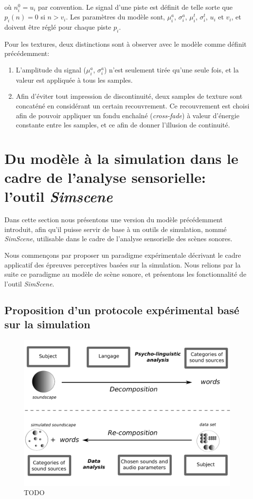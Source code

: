 où $n_i^0=u_i$ par convention. Le signal d'une piste est définit de telle sorte que $p_i(n)=0$ si $n>v_i$. Les paramètres du modèle sont, $\mu^a_i$,  $\sigma^a_i$,   $\mu^t_i$,  $\sigma^t_i$, $u_i$ et $v_i$, et doivent être réglé pour chaque piste $p_i$.


Pour les textures, deux distinctions sont à observer avec le modèle comme définit précédemment: 

\begin{enumerate}
\item L'amplitude du signal ($\mu^a_i$,  $\sigma^a_i$) n'est seulement tirée qu'une seule fois, et la valeur est appliquée à tous les samples.
\item Afin d'éviter tout impression de discontinuité, deux samples de texture sont concaténé en considérant un certain recouvrement. Ce recouvrement est choisi afin de pouvoir appliquer un fondu enchaîné (\emph{cross-fade}) à valeur d'énergie constante entre les samples, et ce afin de donner l'illusion de continuité.
\end{enumerate}



\section{Du modèle à la simulation dans le cadre de l'analyse sensorielle: l'outil \emph{Simscene}}

Dans cette section nous présentons une version du modèle précédemment introduit, afin qu'il puisse servir de base à  un outils de simulation, nommé \emph{SimScene}, utilisable dans le cadre de l'analyse sensorielle des scènes sonores.

Nous commençons par proposer un paradigme expérimentale  décrivant le cadre applicatif des épreuves perceptives basées sur la simulation. Nous relions par la suite ce paradigme au modèle de scène sonore, et présentons les fonctionnalité de l'outil \emph{SimScene}.

\subsection{Proposition d'un protocole expérimental basé sur la simulation}


\begin{figure}[bth]
        \myfloatalign
        \includegraphics[width=.8\linewidth]{gfx/1}
       \caption{TODO}\label{fig:paradigmeSimu1}
\end{figure}

